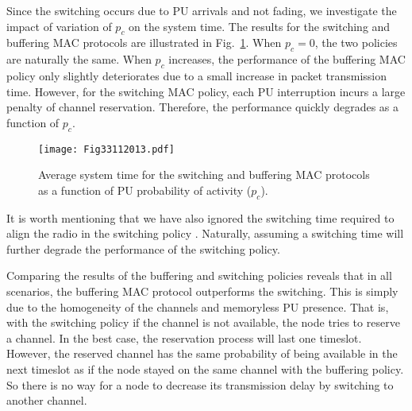 \documentclass[12pt,journal,oneside,onecolumn]{IEEEtran}
\begin{document}
Since the switching occurs due to PU arrivals and not fading, 
we investigate the impact of variation of $p_c$ on the system time. The results for the switching and buffering MAC protocols are 
illustrated in Fig.~\ref{Fig33112013.pdf}. When $p_c=0$, the two policies 
are naturally the same. When $p_c$ increases, the performance of the buffering MAC policy
only slightly deteriorates due to a small increase in packet transmission time. However, for the switching
MAC policy, each PU interruption incurs a large penalty of channel reservation. Therefore, the performance
quickly degrades as a function of $p_c$.
\begin{figure}\centering
\texttt{[image: Fig33112013.pdf]}\caption{Average system time for the switching and buffering MAC protocols as a function of PU probability of activity ($p_c$).}\label{Fig33112013.pdf}\end{figure}
It is worth mentioning that we have also ignored the switching time required 
to align the radio in the switching policy \cite{park11}. Naturally, 
assuming a switching time will further degrade the 
performance of the switching policy.

Comparing the results of the buffering and switching 
policies reveals that in all  scenarios, the buffering 
MAC protocol outperforms the switching. 
This is simply due to the homogeneity of the channels and memoryless
PU presence. That is, with the switching policy if the channel is not available,
the node tries to reserve a channel. In the best case, the reservation process
will last one timeslot. However, the reserved
channel has the same probability of being available in the next timeslot as if
the node stayed on the same channel with the buffering policy.
So there is no way for a node to decrease its transmission delay
by switching to another channel.
\end{document}
